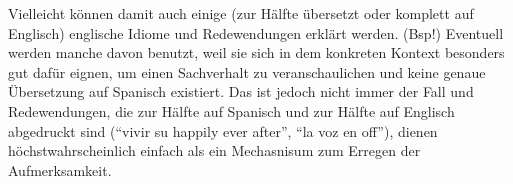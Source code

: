 Vielleicht können damit auch einige (zur Hälfte übersetzt oder komplett auf Englisch) englische Idiome und Redewendungen erklärt werden.
(Bsp!)
Eventuell werden manche davon benutzt, weil sie sich in dem konkreten Kontext besonders gut dafür eignen, um einen Sachverhalt zu veranschaulichen und keine genaue Übersetzung auf Spanisch existiert.
Das ist jedoch nicht immer der Fall und Redewendungen, die zur Hälfte auf Spanisch und zur Hälfte auf Englisch abgedruckt sind (``vivir su happily ever after'', ``la voz en off''), dienen höchstwahrscheinlich einfach als ein Mechasnisum zum Erregen der Aufmerksamkeit.

\begin{comment}

       5) Anglicisms can play the role of neutralizer between competing dialectal variants because the
       prestigious outside language acts as the lingua franca that resolves the conflict without favoring one
       group at the expense of the other.
      * influence of the media: "they do contribute to popular acceptance and use of some new vocabulary" [Zentella90]
        (siehe oben bei Spanglish)
        -> Spielen auch für leveling eine Rolle: versuchen neutrale Varianten zu nutzen, um möglichst mehr Menschen zu erreichen; und die ist manchmal eben auf Englisch?

------------------
{Andr07}
"Language mixing is no doubt part of the symbolic capital that
  lifestyle magazines like Latina (the ‘Magazine for Hispanic Women’) and rap
  stars like N.O.R.E. (‘Oye Mi Canto’) sell to their audiences."

"A few media genres seem to approach this
  authenticity, e.g. live radio talk or computer-mediated interaction; but in
  advertising, television shows, song lyrics, movies or fashion magazines, the
  decision to use two or more languages is subject to careful planning, editing
  and staging. What could be less authentic than that?"

According to his classification of media, mein Fall fällt hier rein:
"Private commercial media conceive of their
  audience as consumers rather than citizens. Broadcasting a meaningful
  programme is far less important than attracting the attention of potential
  consumers of the media output and of the products and services advertised
  therein."
anders als non-commercial community media, die ein emanzipatorisches Bildungsprojekt haben


\end{comment}

